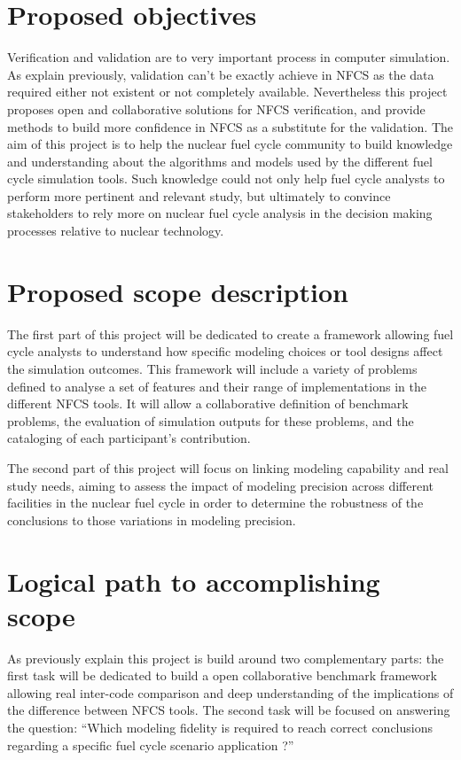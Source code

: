 \section{Proposed objectives}

Verification and validation are to very important process in computer
simulation. As explain previously, validation can't be exactly achieve in NFCS
as the data required either not existent or not completely available.
Nevertheless this project proposes open and collaborative solutions for NFCS
verification, and provide methods to build more confidence in NFCS as a
substitute for the validation.
The aim of this project is to help the nuclear fuel cycle community to build
knowledge and understanding about the algorithms and models used by the
different fuel cycle simulation tools. Such knowledge could not only help fuel
cycle analysts to perform more pertinent and relevant study, but ultimately to
convince stakeholders to rely more on nuclear fuel cycle analysis in the
decision making processes relative to nuclear technology.



\section{Proposed scope description}


The first part of this project will be dedicated to create a framework allowing
fuel cycle analysts to understand how specific modeling choices or tool designs
affect the simulation outcomes. This framework will include a variety of
problems defined to analyse a set of features and their range of implementations
in the different NFCS tools. It will allow a collaborative definition of
benchmark problems, the evaluation of simulation outputs for these problems, and
the cataloging of each participant’s contribution.

The second part of this project will focus on linking modeling capability and
real study needs, aiming to assess the impact of modeling precision across
different facilities in the nuclear fuel cycle in order to determine the
robustness of the conclusions to those variations in modeling precision.



\section{Logical path to accomplishing scope}

As previously explain this project is build around two complementary parts: the
first task will be dedicated to build a open collaborative benchmark framework
allowing real inter-code comparison and deep understanding of the implications
of the difference between NFCS tools. The second task will be focused on
answering the question: ``Which modeling fidelity is required to reach correct
conclusions regarding a specific fuel cycle scenario application ?''


